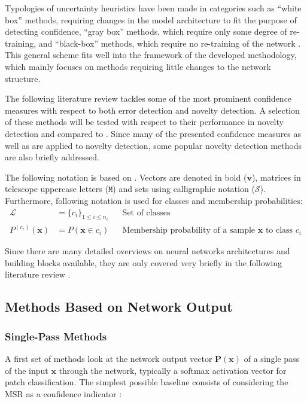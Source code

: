 \documentclass[10pt]{article}
\begin{document}
Typologies of uncertainty heuristics have been made in categories such as ``white box'' methods, requiring changes in the model architecture to fit the purpose of detecting confidence, ``gray box'' methods, which require only some degree of re-training, and ``black-box'' methods, which require no re-training of the network \cite{Bahat_2018}. This general scheme fits well into the framework of the developed methodology, which mainly focuses on methods requiring little changes to the network structure.

The following literature review tackles some of the most prominent confidence measures with respect to both error detection and novelty detection. A selection of these methods will be tested with respect to their performance in novelty detection and compared to . Since many of the  presented confidence measures as well as  are applied to novelty detection, some popular novelty detection methods are also briefly addressed.

The following notation is based on \cite{decisionForests-MSR}. Vectors are denoted in bold ($\mathbf{v}$), matrices in telescope uppercase letters ($\mathtt{M}$) and sets using calligraphic notation ($\mathcal{S}$). Furthermore, following notation is used for classes and membership probabilities:
\begin{align}
\mathcal{L}&=\{c_i\}_{1\leq i\leq n_c}&& \text{Set of classes}\\
P^{(c_i)}(\mathbf{x})&=P(\mathbf{x}\in c_i)&& \text{Membership probability of a sample } \mathbf{x} \text{ to class } c_i
\end{align}

Since there are many detailed overviews on neural networks architectures and building blocks available, they are only covered very briefly in the following literature review \cite{Schmidhuber2015DeepLI, Zhu2017DeepLI, Kampffmeyer2016SemanticSO}.

\subsection{Methods Based on Network Output}
\subsubsection{Single-Pass Methods}
A first set of methods look at the network output vector $\mathbf{P}(\mathbf{x})$ of a single pass of the input $\mathbf{x}$ through the network, typically a softmax activation vector for patch classification. The simplest possible baseline consists of considering the \gls{MSR} as a confidence indicator \cite{HendrycksG16c, zaragoza}:
\end{document}
